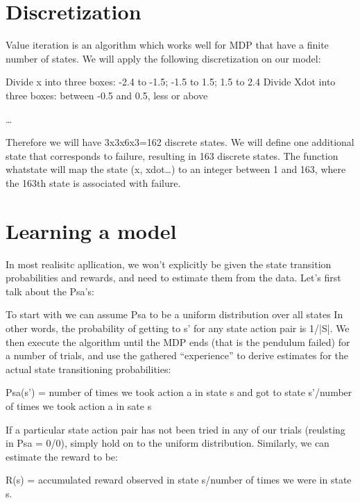 \documentclass[final,3p,times,twocolumn]{elsarticle}
\begin{document}
\section{Discretization}
Value iteration is an algorithm which works well for MDP that have a finite number of states. We will apply the following discretization on our model:\par
Divide x into three boxes: -2.4 to -1.5; -1.5 to 1.5; 1.5 to 2.4
Divide Xdot into three boxes: between -0.5 and 0.5, less or above\par
…\par
Therefore we will have 3x3x6x3=162 discrete states.
We will define one additional state that corresponds to failure, resulting in 163 discrete states.
The function whatstate will map the state (x, xdot…) to an integer between 1 and 163, where the 163th state is associated with failure.

\section{Learning a model}
In most realisitc apllication, we won’t explicitly be given the state transition probabilities and rewards, and need to estimate them from the data.
Let’s first talk about the Psa’s:\par
To start with we can assume Psa to be a uniform distribution over all states In other words, the probability of getting to s’ for any state action pair is 1/|S|.
We then execute the algorithm until the MDP ends (that is the pendulum failed) for a number of trials, and use the gathered “experience” to derive estimates for the actual state transitioning probabilities:\par
Psa(s’) = number of times we took action a in state s and got to state s’/number of times we took action a in sate s\par
If a particular state action pair has not been tried in any of our trials (reulsting in Psa = 0/0), simply hold on to the uniform distribution.
Similarly, we can estimate the reward to be:\par 
R(s) = accumulated reward observed in state s/number of times we were in state s.
\end{document}
